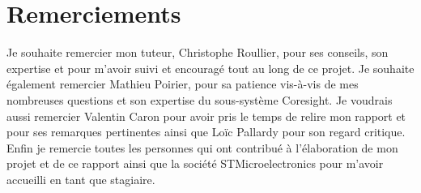 
\section*{Remerciements}
\label{pref:acknowledgements}

Je souhaite remercier mon tuteur, Christophe Roullier, pour ses conseils, son
expertise et pour m'avoir suivi et encouragé tout au long de ce projet.  Je
souhaite également remercier Mathieu Poirier, pour sa patience vis-à-vis de
mes nombreuses questions et son expertise du sous-système Coresight. Je
voudrais aussi remercier Valentin Caron pour avoir pris le temps de relire mon
rapport et pour ses remarques pertinentes ainsi que Loïc Pallardy pour son
regard critique. \\

Enfin je remercie toutes les personnes qui ont contribué à l'élaboration de
mon projet et de ce rapport ainsi que la société STMicroelectronics pour
m'avoir accueilli en tant que stagiaire. \\
